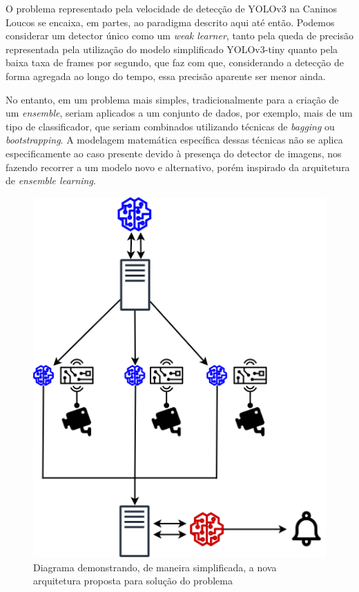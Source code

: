 \documentclass[]{politex}
\begin{document}
O problema representado pela velocidade de detecção de YOLOv3 na Caninos Loucos se encaixa, em partes, ao paradigma descrito aqui até então. Podemos considerar um detector único como um \textit{weak learner}, tanto pela queda de precisão representada pela utilização do modelo simplificado YOLOv3-tiny quanto pela baixa taxa de frames por segundo, que faz com que, considerando a detecção de forma agregada ao longo do tempo, essa precisão aparente ser menor ainda.

No entanto, em um problema mais simples, tradicionalmente para a criação de um \textit{ensemble}, seriam aplicados a um conjunto de dados, por exemplo, mais de um tipo de classificador, que seriam combinados utilizando técnicas de \textit{bagging} ou \textit{bootstrapping}. A modelagem matemática específica dessas técnicas não se aplica especificamente ao caso presente devido à presença do detector de imagens, nos fazendo recorrer a um modelo novo e alternativo, porém inspirado da arquitetura de \textit{ensemble learning}.

\begin{figure}[ht]
  \centering
  \includegraphics[scale=0.7]{img/novaarquitetura.png}
  \caption{Diagrama demonstrando, de maneira simplificada, a nova arquitetura proposta para solução do problema}
  \label{fig:novaarquitetura}
\end{figure}
\end{document}
